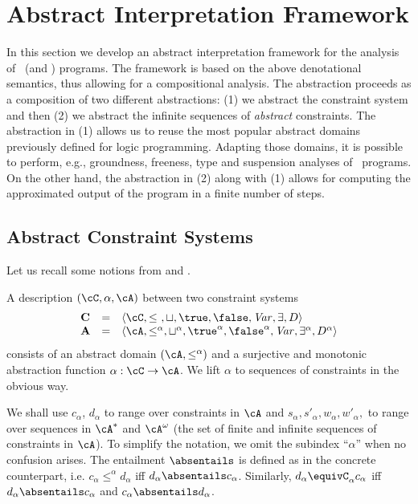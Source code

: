 \documentclass{tlp}
\begin{document}
\section{Abstract Interpretation Framework}\label{sec:absframework}
In this section we develop an abstract interpretation framework \cite{CC92} 
for the analysis of \utcc\ (and \tccp) programs. 
The framework is based on the above denotational semantics, thus allowing for a 
compositional analysis. 
The abstraction  proceeds as a composition of two different abstractions:  (1) we  abstract the constraint system and then (2) we abstract the  infinite sequences of \emph{abstract} constraints. The abstraction in (1) allows us to reuse the most popular abstract domains previously defined for logic programming. Adapting those domains, it is possible to perform, e.g., groundness, freeness, type and suspension analyses of \utcc\ programs. On the other hand, the abstraction in (2) along with (1) allows for computing the approximated output of the program in a finite number of steps. 

\subsection{Abstract Constraint Systems}
Let us recall some notions from \cite{Falaschi:97:TCS} and \cite{ZaffanellaGL97}. 


\begin{definition}[Descriptions] \label{def:description}
A description $(\cC,\alpha, \cA)$ between  two constraint systems 
\[
\begin{array}{lll}
{\bf C} &=& \langle \cC,\leq\ , \sqcup,\true, \false, {\it Var}, \exists, D \rangle \\
{\bf A} &=&  \langle \cA,\leq^\alpha, \sqcup^\alpha,\true^\alpha, \false^\alpha, {\it Var}, \exists^\alpha, D^\alpha \rangle
\end{array}
\]
  consists of an abstract domain  $(\cA,\leq^\alpha)$ and a surjective and monotonic abstraction function $\alpha: \cC \to \cA$. We lift $\alpha$ to sequences of constraints in the obvious way. 
\end{definition}

We shall use $c_{\alpha}$, $d_{\alpha}$ to range over constraints in ${\cA}$ and $s_\alpha, s'_\alpha, w_\alpha, w'_\alpha,  $ to range over sequences in $\cA^*$ and $\cA^\omega$ (the set of finite and infinite sequences of constraints in $\cA$). To simplify the notation, we omit the 
subindex ``$\alpha$'' when no confusion arises.  The entailment $\absentails$ is defined as in the concrete counterpart, i.e.  $c_{\alpha} \leq^\alpha d_{\alpha}$ iff $d_{\alpha} \absentails c_{\alpha}$. Similarly,   $d_\alpha \equivC_\alpha c_\alpha$ iff 
$d_{\alpha} \absentails c_{\alpha}$ and 
$c_{\alpha} \absentails d_{\alpha}$. 
\end{document}
